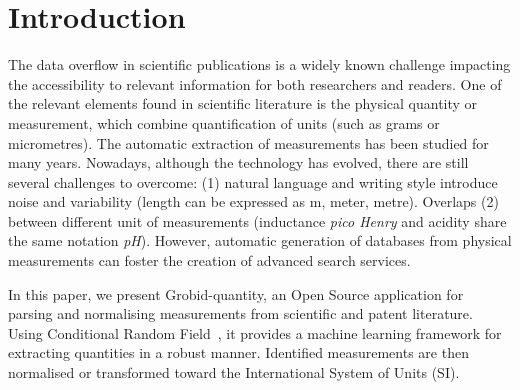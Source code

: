 \documentclass[sigconf]{acmart}
\begin{document}


\maketitle

\section{Introduction}

The data overflow in scientific publications is a widely known challenge impacting the accessibility to relevant information for both researchers and readers. 
One of the relevant elements found in scientific literature is the physical quantity or measurement, which combine quantification of units (such as grams or micrometres). The automatic extraction of measurements has been studied for many years. Nowadays, although the technology has evolved, there are still several challenges to overcome: (1) natural language and writing style introduce noise and variability (length can be expressed as m, meter, metre). Overlaps (2) between different unit of measurements (inductance \textit{pico Henry} and acidity share the same notation \textit{pH}). However, automatic generation of databases from physical measurements can foster the creation of advanced search services. 

In this paper, we present Grobid-quantity, an Open Source application \cite{grobid-quantities} for parsing and normalising measurements from scientific and patent literature. Using Conditional Random Field~\cite{lafferty2001conditional}, it provides a machine learning framework for extracting quantities in a robust manner. Identified measurements are then normalised or transformed toward the International System of Units (SI). 
\end{document}
